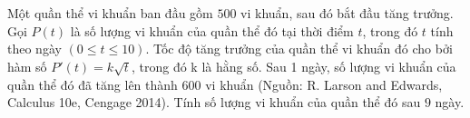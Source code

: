 \begin{ex}%
Một quần thể vi khuẩn ban đầu gồm $500$ vi khuẩn, sau đó bắt đầu tăng trưởng. Gọi $P(t)$ là số lượng vi khuẩn của quần thể đó tại thời điểm $t$, trong đó $ t$ tính theo ngày $(0\le t\le 10)$. Tốc độ tăng trưởng của quần thể vi khuẩn đó cho bởi hàm số $P'(t)=k\sqrt{t}$, trong đó k là hằng số. Sau 1 ngày, số lượng vi khuẩn của quần thể đó đã tăng lên thành 600 vi khuẩn (Nguồn: R. Larson and
Edwards, Calculus 10e, Cengage 2014). Tính số lượng vi khuẩn của quần thể đó sau $9$ ngày.

\end{ex}

